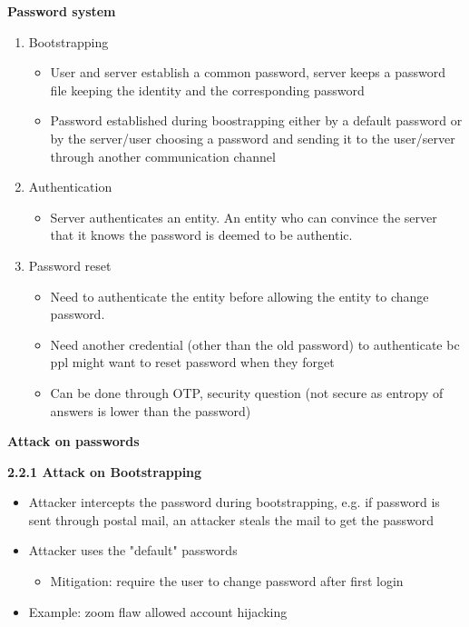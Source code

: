 \documentclass[landscape,a4paper]{extarticle}
\begin{document}
\begin{multicols*}{5}
    \textbf{Password system}

    \begin{enumerate}
        \item Bootstrapping
        \begin{itemize}
            \item User and server establish a common password, server keeps a password file keeping the 
            identity and the corresponding password
            \item Password established during boostrapping either by a default password
            or by the server/user choosing a password and sending it to the user/server through another
            communication channel
        \end{itemize}
        \item Authentication
        \begin{itemize}
            \item Server authenticates an entity. An entity who can convince the server that it knows
            the password is deemed to be authentic.
        \end{itemize}
        \item Password reset
        \begin{itemize}
            \item Need to authenticate the entity before allowing the entity to change password.
            \item Need another credential (other than the old password) to authenticate bc ppl might 
            want to reset password when they forget
            \item Can be done through OTP, security question (not secure as entropy of answers is 
            lower than the password)
        \end{itemize}
    \end{enumerate}

    \textbf{Attack on passwords}

    \textbf{2.2.1 Attack on Bootstrapping}
    \begin{itemize}
        \item Attacker intercepts the password during bootstrapping, e.g. if password
        is sent through postal mail, an attacker steals the mail to get the password
        \item Attacker uses the "default" passwords
        \begin{itemize}
            \item Mitigation: require the user to change password after first login
        \end{itemize}
        \item Example: zoom flaw allowed account hijacking
    \end{itemize}


\end{multicols*}
\end{document}
